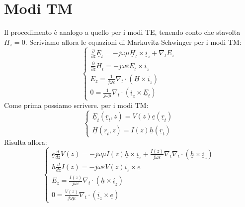 \documentclass{book}
\begin{document}
\section{Modi TM}
    Il procedimento è analogo a quello per i modi TE, tenendo conto che stavolta $H_{z} = 0$. Scriviamo allora le equazioni 
    di Markuvitz-Schwinger per i modi TM:
    \begin{equation}
        \begin{cases}
            \displaystyle \frac{\partial}{ \partial z}\underline{E}_{t} = -j \omega \mu \underline{H}_{t} \times \underline{i}_{z} + \nabla_{t} E_{z} \\
            \displaystyle \frac{\partial}{\partial z} \underline{H}_{t} = -j \omega \varepsilon \underline{E}_{t} \times \underline{i}_{z} \\
            \displaystyle E_{z} = \frac{1}{j \omega \varepsilon} \nabla_{t} \cdot (\underline{H} \times \underline{i}_{z}) \\
            \displaystyle 0 = \frac{1}{j \omega \mu} \nabla_{t} \cdot (\underline{i}_{z} \times \underline{E}_{t})
        \end{cases}
    \end{equation}
    Come prima possiamo scrivere. per i modi TM:
    \begin{equation}
        \begin{cases}
        \displaystyle \underline{E}_{t} (\underline{r}_{t},z) = V(z) \underline{e}(\underline{r}_{t}) \\
        \displaystyle \underline{H}(\underline{r}_{t},z) = I(z)\underline{h}(\underline{r}_{t})
        \end{cases}        
    \end{equation}
    Risulta allora:
    \begin{equation}
        \begin{cases}
            \displaystyle \underline{e} \frac{d}{dz}V(z)=-j \omega \mu I(z) \underline{h} \times \underline{i}_{z} + \frac{I(z)}{j \omega \varepsilon} \nabla_{t} \nabla_{t} \cdot (\underline{h} \times \underline{i}_{z}) \\
            \displaystyle \underline{h} \frac{d}{dz}I(z)=-j \omega \varepsilon V(z)\underline{i}_{z} \times \underline{e} \\
            \displaystyle E_{z} = \frac{I(z)}{j \omega \varepsilon}  \nabla_{t} \cdot (\underline{h} \times \underline{i}_{z})\\
            \displaystyle 0 = \frac{V(z)}{j \omega \mu} \nabla_{t} \cdot (\underline{i}_{z} \times \underline{e})
        \end{cases}
    \end{equation}
\end{document}
